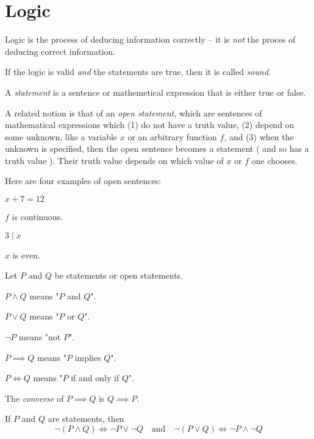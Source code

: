\chapter{Logic}

Logic is the process of deducing information correctly -- it is \emph{not} the proces of deducing correct information.

If the logic is valid \emph{and} the statements are true, then it is called \emph{sound}.


\begin{definition}
	A \emph{statement} is a sentence or mathemetical expression that is either true or false.
\end{definition}

A related notion is that of an \emph{open statement}, which are sentences of mathematical expressions which (1) do not have a truth value, (2) depend on some unknown, like a variable $x$ or an arbitrary function $f$, and (3) when the unknown is specified, then the open sentence becomes a statement ( and so has a truth value ). Their truth value depends on which value of $x$ or $f$ one chooses.

\begin{example}
	Here are four examples of open sentences:
	\bnum
	\item $x + 7 = 12$
	\item $f$ is continuous.
	\item $3 \mid x$
	\item $x$ is even.
	\enum
\end{example}

\begin{named}[Notation]
	Let $P$ and $Q$ be statements or open statements.
\bnum
	\item $P \land Q$ means "$P$ and $Q$".
	\item $P \lor Q$ means "$P$ or $Q$".
	\item $\lnot P$ means "not $P$".
	\item $P \implies Q$ means "$P$ implies $Q$".
	\item $P \iff Q$ means "$P$ if and only if $Q$".
\enum
\end{named}

\begin{definition}
	The \emph{converse} of $P \implies Q$ is $Q \implies P$.
\end{definition}

\begin{theorem}
	If $P$ and $Q$ are statements, then
	$$\lnot (P \land Q) \iff \lnot P \lor \lnot Q \quad \text{and} \quad
		\lnot (P \lor Q) \iff \lnot P \land \lnot Q$$
\end{theorem}


